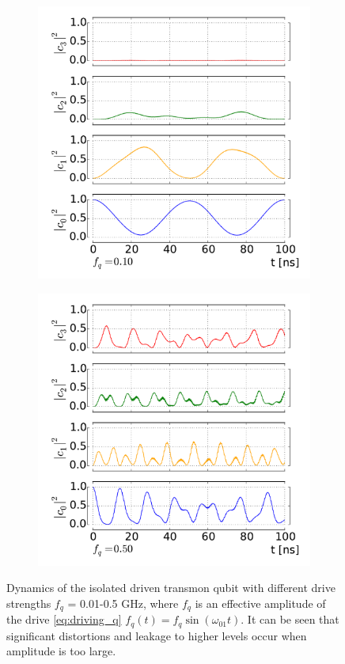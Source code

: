 \documentclass[12pt]{report}
\numberwithin{equation}{section}
\begin{document}
\begin{figure}[h!]
\begin{subfigure}[t]{0.45\textwidth}
\includegraphics[width=\textwidth]{tr_str_dr}
\end{subfigure}
\begin{subfigure}[t]{0.45\textwidth}
\includegraphics[width=\textwidth]{tr_vstr_dr}
\end{subfigure}
\caption{Dynamics of the isolated driven transmon qubit with different drive strengths $f_q$ = 0.01-0.5 GHz, where $f_q$ is an effective amplitude of the drive \eqref{eq:driving_q} $f_q (t) = f_q \sin(\omega_{01} t)$. It can be seen that significant distortions and leakage to higher levels occur when amplitude is too large.}
\label{fig:driven_tr}
\end{figure}
\end{document}
